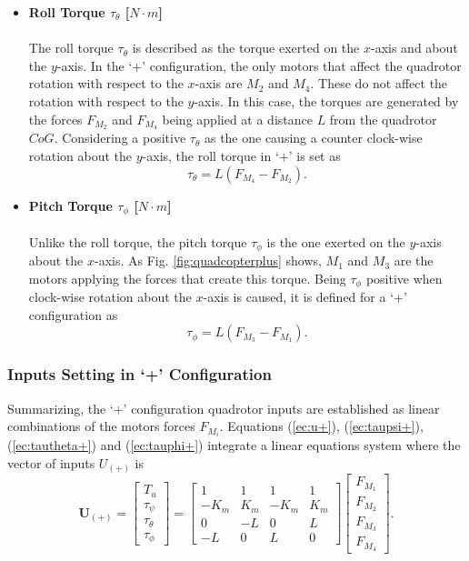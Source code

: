 \begin{itemize}
\item \textbf{Roll Torque $\tau_{\theta}$ [$N\cdot m$]}\\\\
The roll torque $\tau_\theta$ is described as the torque exerted on the $x$-axis and about the $y$-axis. In the `+' configuration, the only motors that affect the quadrotor rotation with respect to the $x$-axis are $M_2$ and $M_4$. These do not affect the rotation with respect to the $y$-axis. In this case, the torques are generated by the forces $F_{M_2}$ and $F_{M_4}$ being applied at a distance $L$ from the quadrotor $CoG$. Considering a positive $\tau_\theta$ as the one causing a counter clock-wise rotation about the $y$-axis, the roll torque in `+' is set as
\begin{equation}
\label{ec:tautheta+}
\tau_{\theta} = L(F_{M_4}-F_{M_2}).
\end{equation}

\item \textbf{Pitch Torque $\tau_{\phi}$ [$N\cdot m$]}\\\\
Unlike the roll torque, the pitch torque $\tau_\phi$ is the one exerted on the $y$-axis about the $x$-axis. As Fig. \ref{fig:quadcopterplus} shows, $M_1$ and $M_3$ are the motors applying the forces that create this torque. Being $\tau_\phi$ positive when clock-wise rotation about the $x$-axis is caused, it is defined for a `+' configuration as
\begin{equation}
\label{ec:tauphi+}
\tau_{\phi} = L(F_{M_3}-F_{M_1}).
\end{equation}
\end{itemize}

\subsubsection{Inputs Setting in `+' Configuration}
Summarizing, the `+' configuration quadrotor inputs are established as linear combinations of the motors forces $F_{M_i}$. Equations (\ref{ec:u+}), (\ref{ec:taupsi+}), (\ref{ec:tautheta+}) and (\ref{ec:tauphi+}) integrate a linear equations system where the vector of inputs $U_{(+)}$ is
\begin{equation}
	\mathbf{U_{(+)}} = \begin{bmatrix}
	T_u\\[5pt]
	\tau_{\psi}\\[5pt]
	\tau_{\theta}\\[5pt]
	\tau_{\phi}
	\end{bmatrix} = \begin{bmatrix}
	1 & 1 & 1 & 1 \\[5pt]
	-K_{m} & K_{m} & -K_{m} & K_{m}\\[5pt]
	0 & -L & 0 & L\\[5pt]
	-L & 0 & L & 0
							\end{bmatrix}
\begin{bmatrix}
F_{M_1}\\[5pt]
F_{M_2}\\[5pt]
F_{M_3}\\[5pt]
F_{M_4}
\end{bmatrix}.
	\label{ec:U_+}						
\end{equation}

